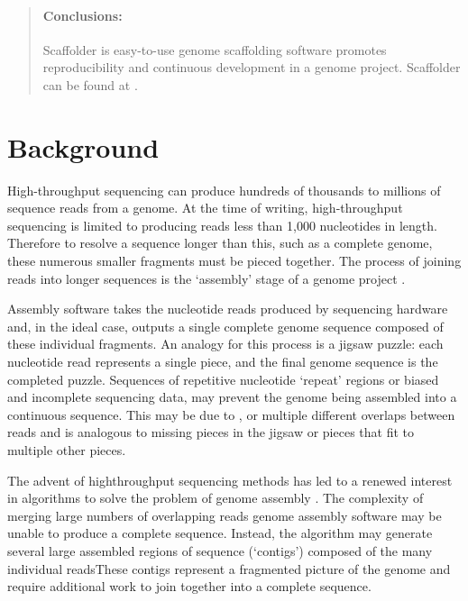 \documentclass[10pt]{bmc_article}
\newenvironment{bmcformat}{\begin{raggedright}\baselineskip20pt\sloppy\setboolean{publ}{false}}{\end{raggedright}\baselineskip20pt\sloppy}
\begin{document}
\begin{bmcformat}
\begin{abstract}
  \paragraph*{Conclusions:} Scaffolder is easy-to-use genome scaffolding
  software promotes reproducibility and continuous
  development in a genome project. Scaffolder can be found at \scaffolder.

\end{abstract}


\clearpage

\section*{Background} %

High-throughput sequencing can produce hundreds of thousands to millions of
sequence reads from a genome. At the time of writing, high-throughput
sequencing is limited to producing reads less than 1,000 nucleotides in length.
Therefore to resolve a sequence longer than this, such as a complete genome,
these numerous smaller fragments must be pieced together. The process of
joining reads into longer sequences is the `assembly' stage of a genome project
\cite{miller2010}. \pb

Assembly software takes the nucleotide reads produced by sequencing hardware
and, in the ideal case, outputs a single complete genome sequence composed of
these individual fragments. An analogy for this process is a jigsaw puzzle:
each nucleotide read represents a single piece, and the final genome sequence
is the completed puzzle. Sequences of repetitive nucleotide `repeat' regions
or biased and incomplete sequencing data, may
prevent the genome being assembled into a continuous sequence. This may be due
to , or multiple different overlaps between
reads and is analogous to missing pieces in the jigsaw or pieces that fit to
multiple other pieces. \pb

The advent of high\add{-}throughput sequencing methods has led to a renewed
interest in algorithms to solve the problem of genome assembly
\cite{pop2008,pop2009}. The complexity of merging
large numbers of overlapping reads  genome assembly software
may be unable to produce a complete sequence. Instead, the algorithm may
generate several large assembled regions of sequence (`contigs') composed of
the many individual readsThese contigs represent
a fragmented picture of the genome and  require additional work
to join together into a complete sequence. \pb


\end{bmcformat}
\end{document}

